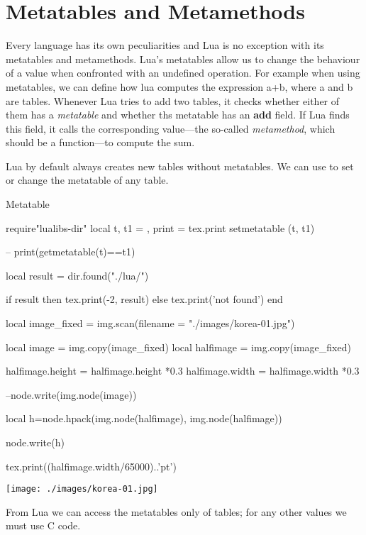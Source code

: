 \chapter{Metatables and Metamethods}

\def\textdblunderscore#1{{\bfseries \textunderscore\hskip1pt\textunderscore#1}}

Every language has its own peculiarities and Lua is no exception with its metatables and metamethods. Lua’s metatables allow us to change the behaviour of a value when confronted with an undefined operation. For example when using metatables, we can define how lua computes the expression a+b, where a and b are tables. Whenever Lua tries to add two tables, it checks whether either of them has a \emph{metatable} and whether ths metatable has an \textdblunderscore{add} field. If Lua finds this field, it calls the corresponding value---the so-called \emph{metamethod}, which should be a function---to compute the sum.

Lua by default always creates new tables without metatables. We can use  to set or change the metatable of any table.

\begin{texexample}{Metatable}{}
\begin{luacode}
require"lualibs-dir"
local t, t1 = {}, {}
  print = tex.print
  setmetatable (t, t1)

-- print(getmetatable(t)==t1)

local result = dir.found("./lua/")

if result then tex.print(-2, result) else tex.print('not found')  end

local image_fixed = img.scan({filename = "./images/korea-01.jpg"})

local image     = img.copy(image_fixed)
local halfimage = img.copy(image_fixed)

halfimage.height = halfimage.height *0.3
halfimage.width  = halfimage.width  *0.3

--node.write(img.node(image))


local h=node.hpack(img.node(halfimage), img.node(halfimage))

node.write(h)

tex.print((halfimage.width/65000)..'pt')

\end{luacode}
\end{texexample}
\texttt{[image: ./images/korea-01.jpg]}

From Lua we can access the metatables only of tables; for any other values we must use C code. 
